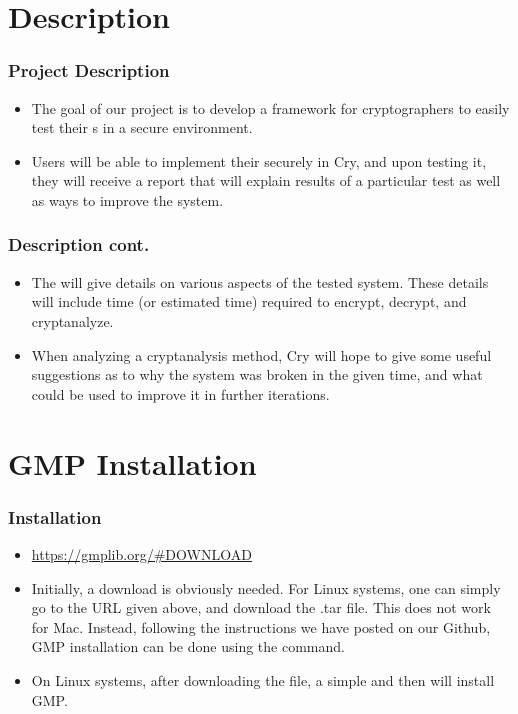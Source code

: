 \section{\cry{} Description}

\begin{frame}
\frametitle{Project Description}
  \begin{itemize}
  \item The goal of our project is to develop a framework for
    cryptographers to easily test their \cs s in a
    secure environment.
  \item Users will be able to implement their
    \cs{} securely in Cry, and upon testing it, they will
    receive a report that will explain results of a particular
    test as well as ways to improve the system.
  \end{itemize}
\end{frame}

\begin{frame}
\frametitle{Description cont.}
  \begin{itemize}
  \item The will give details on various aspects of the tested system.
    These details will include time (or estimated time) required
    to encrypt, decrypt, and cryptanalyze.
  \item When analyzing a
    cryptanalysis method, Cry will hope to give some useful
    suggestions as to why the system was broken in the given
    time, and what could be used to improve it in further
    iterations.
  \end{itemize}
\end{frame}



\section{GMP Installation}

\begin{frame}
\frametitle{Installation}
\begin{itemize}
\item \url{https://gmplib.org/\#DOWNLOAD}
\item Initially, a download is obviously needed. For Linux
  systems, one can simply go to the URL given above, and
  download the .tar file. This does not work for Mac.
  Instead, following the instructions we have posted on our
  Github, GMP installation can be done using the  command.
\item On Linux systems, after downloading the file, a
  simple  and then 
  will install GMP.
\end{itemize}
\end{frame}

